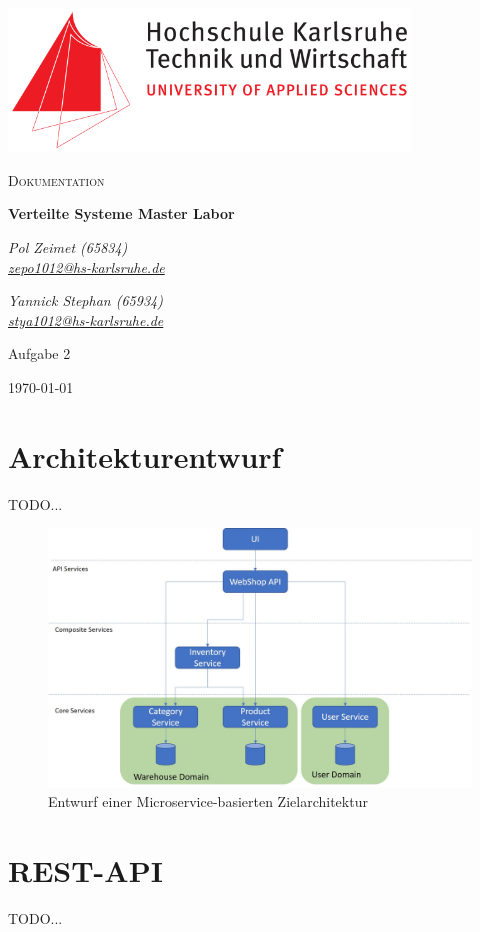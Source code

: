 \documentclass[12pt,a4paper]{article}
\begin{document}
	\begin{titlepage}
		\centering
		\includegraphics[width=0.8\textwidth]{img/Hska_logo.png}\par\vspace{1cm}
		{\scshape\LARGE Dokumentation\par}
		\vspace{1.5cm}
		{\huge\bfseries Verteilte Systeme Master Labor\par}
		\vspace{2cm}
		{\Large\itshape Pol Zeimet (65834) \\\href{mailto:zepo1012@hs-karlsruhe.de}{zepo1012@hs-karlsruhe.de}\par}
		\vfill
		{\Large\itshape Yannick Stephan (65934) \\\href{mailto:stya1012@hs-karlsruhe.de}{stya1012@hs-karlsruhe.de}\par}
		\vfill
		\large Aufgabe 2
		
		\vfill
		
		{\large \today\par}
	\end{titlepage}
	\section{Architekturentwurf}
	\label{sec:Architekturentwurf}
	TODO...
	
	\begin{figure}[H]
		\centering
		\includegraphics[scale=0.5]{diagrams/microservices-architecture.jpg}
		\caption{Entwurf einer Microservice-basierten Zielarchitektur}
	\end{figure}

	\section{REST-API}
	\label{sec:REST-API}
	TODO...
\end{document}
